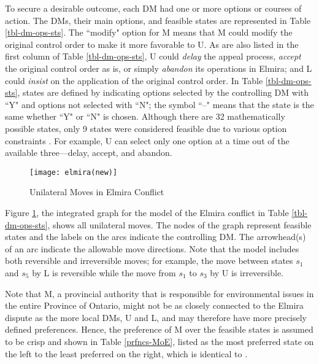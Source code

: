 To secure a desirable outcome, each DM had one or more options or courses of action. The DMs, their main options, and feasible states are represented in Table \ref{tbl-dm-ops-sts}. The ``modify" option for M means that M could modify the original control order to make it more favorable to U. As are also listed in the first column of Table \ref{tbl-dm-ops-sts}, U could \emph{delay} the appeal process, \emph{accept} the original control order as is, or simply \emph{abandon} its operations in Elmira; and L could \emph{insist} on the application of the original control order. In Table \ref{tbl-dm-ops-sts}, states are defined by indicating options selected by the controlling DM with ``Y" and options not selected with ``N"; the symbol ``--" means that the state is the same whether ``Y" or ``N" is chosen. Although there are 32 mathematically possible states, only 9 states were considered feasible due to various option constraints \citep{Fang-et-al1993, Hipel-et-al1993a, Hipel-et-al1999, Kilgour-et-al2001}. For example, U can select only one option at a time out of the available three---delay, accept, and abandon.

\begin{figure}[ht]
\centering
\texttt{[image: elmira(new)]}
\caption{Unilateral Moves in Elmira Conflict}
\label{elmira}
\end{figure}

Figure \ref{elmira}, the integrated graph for the model of the Elmira conflict in Table \ref{tbl-dm-ops-sts}, shows all unilateral moves. The nodes of the graph represent feasible states and the labels on the arcs indicate the controlling DM. The arrowhead(s) of an arc indicate the allowable move directions. Note that the model includes both reversible and irreversible moves; for example, the move between states $s_1$ and $s_5$ by L is reversible while the move from $s_1$ to $s_3$ by U is irreversible.

Note that M, a provincial authority that is responsible for environmental issues in the entire Province of Ontario, might not be as closely connected to the Elmira dispute as the more local DMs, U and L, and may therefore have more precisely defined preferences. Hence, the preference of M over the feasible states is assumed to be crisp and shown in Table \ref{prfncs-MoE}, listed as the most preferred state on the left to the least preferred on the right, which is identical to \citep{Hipel-et-al1993a, Hipel-et-al1999, Kilgour-et-al2001}.

